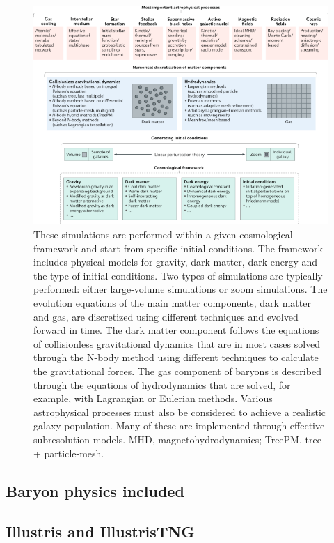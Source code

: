 \documentclass{book}
\begin{document}
\begin{figure}[!htb]
    \centering
    \includegraphics[width=0.8\linewidth]{img/sim-physics.png}
    \caption{These simulations are performed within a given
cosmological framework and start from specific initial conditions. The framework includes physical models for gravity,
dark matter, dark energy and the type of initial conditions. Two types of simulations are typically performed: either
large-volume simulations or zoom simulations. The evolution equations of the main matter components, dark matter
and gas, are discretized using different techniques and evolved forward in time. The dark matter component follows
the equations of collisionless gravitational dynamics that are in most cases solved through the N-body method using
different techniques to calculate the gravitational forces. The gas component of baryons is described through the
equations of hydrodynamics that are solved, for example, with Lagrangian or Eulerian methods. Various astrophysical
processes must also be considered to achieve a realistic galaxy population. Many of these are implemented through
effective subresolution models. MHD, magnetohydrodynamics; TreePM, tree + particle-mesh.}
    \label{fig:enter-label}
\end{figure}



\subsection{Baryon physics included}


\subsection{Illustris and IllustrisTNG}
\end{document}

